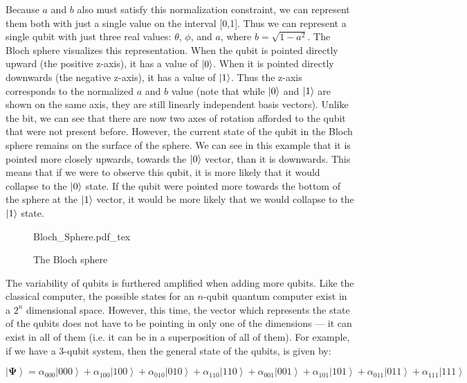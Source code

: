 \documentclass[11pt]{report}
\newcommand{\?}{\stackrel{?}{=}}
\begin{document}
Because $a$ and $b$ also must satisfy this normalization constraint, we can represent them both with just a single value on the interval [0,1]. Thus we can represent a single qubit with just three real values: $\theta$, $\phi$, and $a$, where $b = \sqrt{1 - a^2}$. The Bloch sphere visualizes this representation. When the qubit is pointed directly upward (the positive z-axis), it has a value of $\ket{0}$. When it is pointed directly downwards (the negative z-axis), it has a value of $\ket{1}$. Thus the z-axis corresponds to the normalized $a$ and $b$ value (note that while $\ket{0}$ and $\ket{1}$ are shown on the same axis, they are still linearly independent basis vectors).  Unlike the bit, we can see that there are now two axes of rotation afforded to the qubit that were not present before. However, the current state of the qubit in the Bloch sphere remains on the surface of the sphere. We can see in this example that it is pointed more closely upwards, towards the $\ket{0}$ vector, than it is downwards. This means that if we were to observe this qubit, it is more likely that it would collapse to the $\ket{0}$ state. If the qubit were pointed more towards the bottom of the sphere at the $\ket{1}$ vector, it would be more likely that we would collapse to the $\ket{1}$ state.

\begin{figure}[!h]
    \centering
    \def\svgwidth{2in}
    {Bloch_Sphere.pdf_tex}
    \caption{The Bloch sphere}
    \label{fig:awesome_image}
\end{figure}

The variability of qubits is furthered amplified when adding more qubits. Like the classical computer, the possible states for an $n$-qubit quantum computer exist in a $2^{n}$ dimensional space. However, this time, the vector which represents the state of the qubits does not have to be pointing in only one of the dimensions --- it can exist in all of them (i.e. it can be in a superposition of all of them). For example, if we have a 3-qubit system, then the general state of the qubits, is given by:

$$ \left | \mathbf{\Psi} \right \rangle=\alpha _{000}\left | 000 \right \rangle+\alpha _{100}\left | 100 \right \rangle+\alpha _{010}\left | 010 \right \rangle+\alpha _{110}\left | 110 \right 
                \rangle+\alpha _{001}\left | 001 \right \rangle+\alpha _{101}\left | 101 \right \rangle+\alpha _{011}\left | 011 \right \rangle+\alpha _{111}\left | 111 
                \right \rangle$$
                
\end{document}
